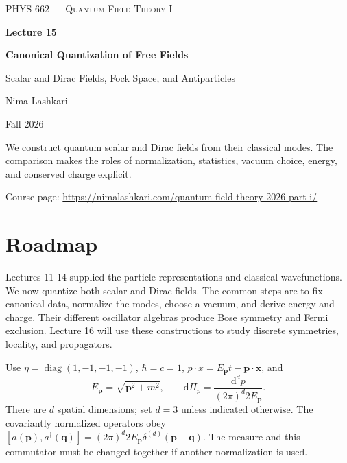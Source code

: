\documentclass[11pt]{article}
\newcommand{\dd}{\mathrm{d}}
\newcommand{\diag}{\operatorname{diag}}
\begin{document}
\begin{titlepage}
\centering
\vspace*{1.2in}
{\scshape\Large PHYS 662 --- Quantum Field Theory I\par}
\vspace{0.35in}
{\Huge\bfseries\color{qftblue} Lecture 15\par}
\vspace{0.18in}
{\LARGE\bfseries Canonical Quantization of Free Fields\par}
\vspace{0.16in}
{\large\color{qftgreen} Scalar and Dirac Fields, Fock Space, and Antiparticles\par}
\vspace{0.6in}
{\large Nima Lashkari\par}
{\large Fall 2026\par}
\vfill
\begin{minipage}{0.86\textwidth}\small
We construct quantum scalar and Dirac fields from their classical modes. The comparison makes the roles of normalization, statistics, vacuum choice, energy, and conserved charge explicit.

\medskip
Course page: \url{https://nimalashkari.com/quantum-field-theory-2026-part-i/}
\end{minipage}
\vspace{0.5in}
\end{titlepage}
\setcounter{tocdepth}{1}\begingroup\small\tableofcontents\endgroup
\newpage
{}

\section*{Roadmap}
Lectures 11-14 supplied the particle representations and classical wavefunctions.
We now quantize both scalar and Dirac fields. The common steps are to fix
canonical data, normalize the modes, choose a vacuum, and derive energy and
charge. Their different oscillator algebras produce Bose symmetry and Fermi
exclusion. Lecture 16 will use these constructions to study discrete
symmetries, locality, and propagators.

\begin{keyidea}
Use \(\eta=\diag(1,-1,-1,-1)\), \(\hbar=c=1\),
\(p\cdot x=E_{\bm p}t-\bm p\cdot\bm x\), and
\[
 E_{\bm p}=\sqrt{\bm p^2+m^2},\qquad
 \dd\Pi_p=\frac{\dd^d p}{(2\pi)^d2E_{\bm p}}.
\]
There are \(d\) spatial dimensions; set \(d=3\) unless indicated otherwise.
The covariantly normalized operators obey
\([a(\bm p),a^\dagger(\bm q)]=(2\pi)^d2E_{\bm p}
\delta^{(d)}(\bm p-\bm q)\). The measure and this commutator must be
changed together if another normalization is used.
\end{keyidea}
\end{document}
